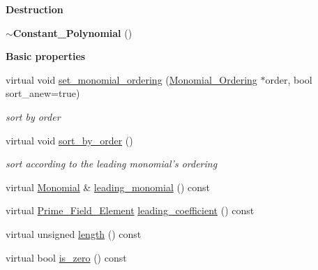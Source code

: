\begin{Indent}\textbf{ Destruction}\par
\begin{DoxyCompactItemize}
\item 
\mbox{\label{class_constant___polynomial_aa535c175852c76c71e0ef556d8e25579}} 
{\bfseries $\sim$\+Constant\+\_\+\+Polynomial} ()
\end{DoxyCompactItemize}
\end{Indent}
\begin{Indent}\textbf{ Basic properties}\par
\begin{DoxyCompactItemize}
\item 
\mbox{\label{class_constant___polynomial_a25ba5d0effd0ad2a0e577906bdc9b99b}} 
virtual void \hyperlink{class_constant___polynomial_a25ba5d0effd0ad2a0e577906bdc9b99b}{set\+\_\+monomial\+\_\+ordering} (\hyperlink{class_monomial___ordering}{Monomial\+\_\+\+Ordering} $\ast$order, bool sort\+\_\+anew=true)
\begin{DoxyCompactList}\small\item\em sort by order \end{DoxyCompactList}\item 
virtual void \hyperlink{class_constant___polynomial_a0cee48bfc1ba32d1ddfd5e78acbf7ba2}{sort\+\_\+by\+\_\+order} ()
\begin{DoxyCompactList}\small\item\em sort according to the leading monomial's ordering \end{DoxyCompactList}\item 
virtual \hyperlink{class_monomial}{Monomial} \& \hyperlink{class_constant___polynomial_a81c14a0b368edec44cef38ba3cbfb1b3}{leading\+\_\+monomial} () const
\item 
virtual \hyperlink{class_prime___field___element}{Prime\+\_\+\+Field\+\_\+\+Element} \hyperlink{class_constant___polynomial_a156c805fdc50c904fcf66807a8e813cc}{leading\+\_\+coefficient} () const
\item 
virtual unsigned \hyperlink{class_constant___polynomial_ae1453ef5c898778065be3c3ea2965a10}{length} () const
\item 
virtual bool \hyperlink{class_constant___polynomial_adbd5016d94426e8ec821449466dd55e7}{is\+\_\+zero} () const
\end{DoxyCompactItemize}
\end{Indent}
